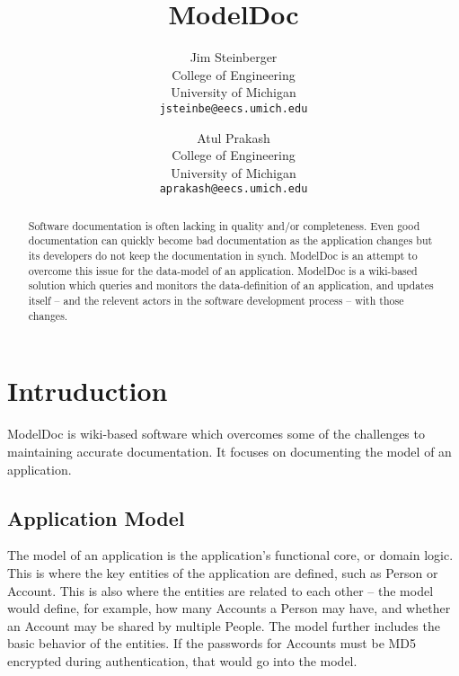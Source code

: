 \documentclass[twocolumn]{article}
\begin{document}
\title{ModelDoc}
\author{Jim Steinberger\\
  College of Engineering\\
  University of Michigan\\
  \texttt{jsteinbe@eecs.umich.edu}
  \and
  Atul Prakash\\
  College of Engineering\\
  University of Michigan\\
  \texttt{aprakash@eecs.umich.edu}}
\maketitle

\begin{abstract}

Software documentation is often lacking in quality and/or completeness.  Even
good documentation can quickly become bad documentation as the application
changes but its developers do not keep the documentation in synch.  ModelDoc is
an attempt to overcome this issue for the data-model of an application.
ModelDoc is a wiki-based solution which queries and monitors the
data-definition of an application, and updates itself -- and the relevent
actors in the software development process -- with those changes.

\end{abstract}

\section{Intruduction}

ModelDoc is wiki-based software which overcomes some of the challenges to
maintaining accurate documentation.  It focuses on documenting the model of an
application.

\subsection{Application Model}

The model of an application is the application's functional core, or domain
logic.  This is where the key entities of the application are defined, such as
Person or Account.  This is also where the entities are related to each other
-- the model would define, for example, how many Accounts a Person may have,
and whether an Account may be shared by multiple People.  The model further
includes the basic behavior of the entities.  If the passwords for Accounts
must be MD5 encrypted during authentication, that would go into the model.
\end{document}

